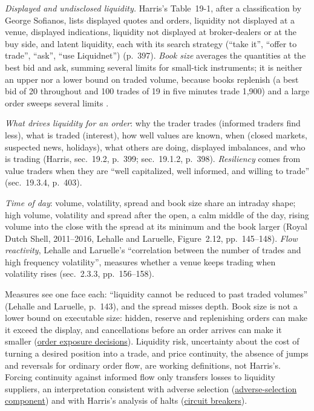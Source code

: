 \begin{qfdefinition}
\emph{Displayed and undisclosed liquidity.} Harris's Table~19-1, after a classification by George Sofianos, lists displayed quotes and orders, liquidity not displayed at a venue, displayed indications, liquidity not displayed at broker-dealers or at the buy side, and latent liquidity, each with its search strategy (``take it'', ``offer to trade'', ``ask'', ``use Liquidnet'') (p.~397). \emph{Book size} averages the quantities at the best bid and ask, summing several limits for small-tick instruments; it is neither an upper nor a lower bound on traded volume, because books replenish (a best bid of 20 throughout and 100 trades of 19 in five minutes trade 1{,}900) and a large order sweeps several limits \citep[chap.~2, sec.~2.2, pp.~143--144]{alpha-laruelle}.

\emph{What drives liquidity for an order}: why the trader trades (informed traders find less), what is traded (interest), how well values are known, when (closed markets, suspected news, holidays), what others are doing, displayed imbalances, and who is trading (Harris, sec.~19.2, p.~399; sec.~19.1.2, p.~398). \emph{Resiliency} comes from value traders when they are ``well capitalized, well informed, and willing to trade'' (sec.~19.3.4, p.~403).

\emph{Time of day}: volume, volatility, spread and book size share an intraday shape; high volume, volatility and spread after the open, a calm middle of the day, rising volume into the close with the spread at its minimum and the book larger (Royal Dutch Shell, 2011--2016, Lehalle and Laruelle, Figure~2.12, pp.~145--148). \emph{Flow reactivity}, Lehalle and Laruelle's ``correlation between the number of trades and high frequency volatility'', measures whether a venue keeps trading when volatility rises (sec.~2.3.3, pp.~156--158).

 Measures see one face each: ``liquidity cannot be reduced to past traded volumes'' (Lehalle and Laruelle, p.~143), and the spread misses depth. Book size is not a lower bound on executable size: hidden, reserve and replenishing orders can make it exceed the display, and cancellations before an order arrives can make it smaller (\hyperref[def:order-exposure-decisions]{order exposure decisions}). Liquidity risk, uncertainty about the cost of turning a desired position into a trade, and price continuity, the absence of jumps and reversals for ordinary order flow, are working definitions, not Harris's. Forcing continuity against informed flow only transfers losses to liquidity suppliers, an interpretation consistent with adverse selection (\hyperref[res:adverse-selection-spread-component]{adverse-selection component}) and with Harris's analysis of halts (\hyperref[mech:circuit-breakers-trading-halts]{circuit breakers}).


\end{qfdefinition}
